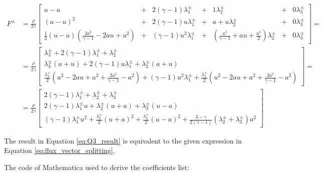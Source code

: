 \begin{align}
    F^\pm & = \frac{\rho}{2\gamma} \begin{bmatrix}
                                       u-a                                                   & + & 2 (\gamma -1) \lambda_1^\pm    & + & 1    \lambda_2^\pm                                          & + & 0 \lambda_3^\pm \\
                                       (a-u)^2                                               & + & 2 (\gamma - 1) u \lambda_1^\pm & + & a+u  \lambda_2^\pm                                          & + & 0 \lambda_3^\pm \\
                                       \frac{1}{2} (u-a) (\frac{2 a^2}{\gamma -1}-2 a u+u^2) & + & (\gamma -1) u^2 \lambda_1^\pm  & + & (\frac{a^2}{\gamma -1} + a u + \frac{u^2}{2}) \lambda_2^\pm & + & 0 \lambda_3^\pm
                                   \end{bmatrix} =         \\
          & =   \frac{\rho}{2\gamma} \begin{bmatrix}
                                         \lambda_3^\pm + 2 (\gamma -1) \lambda_1^\pm                                                                 + \lambda_2^\pm       \\
                                         \lambda_3^\pm (a+u) + 2 (\gamma - 1) u \lambda_1^\pm                                                        + \lambda_2^\pm (a+u) \\
                                         \frac{\lambda_3^\pm}{2} (u^2 - 2 a u + a^2 + \frac{2 a^2}{\gamma -1} - a^2) + (\gamma -1) u^2 \lambda_1^\pm + \frac{\lambda_2^\pm}{2} (u^2 - 2 a u + a^2 + \frac{2 a^2}{\gamma -1} - a^2)
                                     \end{bmatrix} = \\
          & = \frac{\rho}{2\gamma} \begin{bmatrix}
                                       2 (\gamma -1) \lambda_1^\pm + \lambda_2^\pm + \lambda_3^\pm                   \\
                                       2 (\gamma -1) \lambda_1^\pm u + \lambda_2^\pm (u + a) + \lambda_3^\pm (u - a) \\
                                       (\gamma - 1) \lambda_1^\pm u^2 + \frac{\lambda_2^\pm}{2} (u + a)^2 + \frac{\lambda_3^\pm}{2} (u - a)^2 + \frac{3-\gamma}{2(\gamma - 1)} (\lambda_2^\pm + \lambda_3^\pm) a^2
                                   \end{bmatrix}
    \label{eq:Q3_result}
\end{align}

The result in Equation \ref{eq:Q3_result} is equivalent to the given expression in Equation \ref{eq:flux_vector_splitting}.

The code of Mathematica used to derive the coefficients list:




